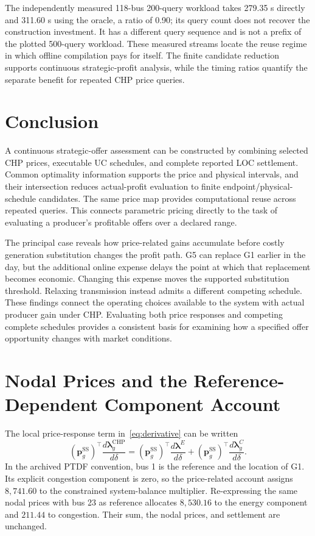 \documentclass[journal]{IEEEtran}
\newcommand{\bp}{\bm p}
\newcommand{\blambda}{\bm\lambda}
\newcommand{\SSched}{\mathrm{SS}}
\newcommand{\CHP}{\mathrm{CHP}}
\begin{document}
The independently measured 118-bus 200-query workload takes 279.35 s directly and 311.60 s using the oracle, a ratio of 0.90; its query count does not recover the construction investment. It has a different query sequence and is not a prefix of the plotted 500-query workload. These measured streams locate the reuse regime in which offline compilation pays for itself. The finite candidate reduction supports continuous strategic-profit analysis, while the timing ratios quantify the separate benefit for repeated CHP price queries.

\section{Conclusion}\label{sec:conclusion}
A continuous strategic-offer assessment can be constructed by combining selected CHP prices, executable UC schedules, and complete reported LOC settlement. Common optimality information supports the price and physical intervals, and their intersection reduces actual-profit evaluation to finite endpoint/physical-schedule candidates. The same price map provides computational reuse across repeated queries. This connects parametric pricing directly to the task of evaluating a producer's profitable offers over a declared range.

The principal case reveals how price-related gains accumulate before costly generation substitution changes the profit path. G5 can replace G1 earlier in the day, but the additional online expense delays the point at which that replacement becomes economic. Changing this expense moves the supported substitution threshold. Relaxing transmission instead admits a different competing schedule. These findings connect the operating choices available to the system with actual producer gain under CHP. Evaluating both price responses and competing complete schedules provides a consistent basis for examining how a specified offer opportunity changes with market conditions.

\appendices
\section{Nodal Prices and the Reference-Dependent Component Account}\label{app:prices}
The local price-response term in~\eqref{eq:derivative} can be written
\begin{equation}
 (\bp_g^{\SSched})^\top\frac{d\blambda_g^{\CHP}}{d\delta}
 =(\bp_g^{\SSched})^\top\frac{d\blambda^E}{d\delta}
 +(\bp_g^{\SSched})^\top\frac{d\blambda_g^C}{d\delta}.
\end{equation}
In the archived PTDF convention, bus 1 is the reference and the location of G1. Its explicit congestion component is zero, so the price-related account assigns $8{,}741.60$ to the constrained system-balance multiplier. Re-expressing the same nodal prices with bus 23 as reference allocates $8{,}530.16$ to the energy component and $211.44$ to congestion. Their sum, the nodal prices, and settlement are unchanged.
\end{document}
